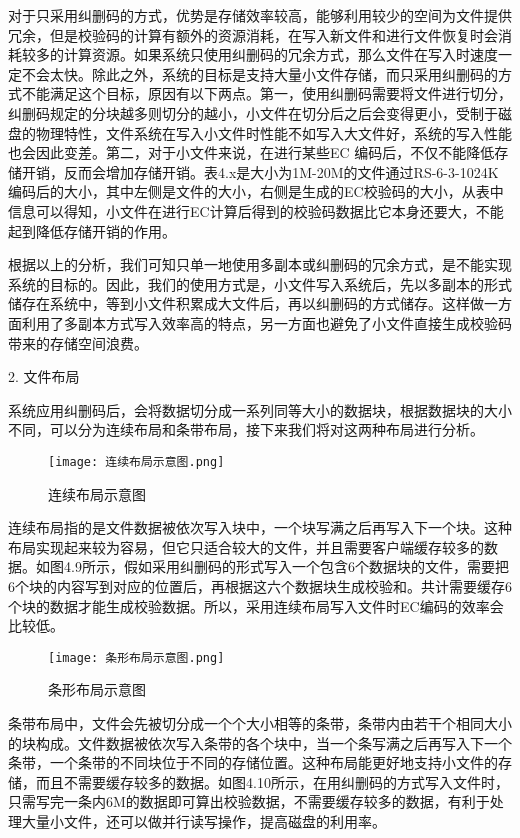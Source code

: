 对于只采用纠删码的方式，优势是存储效率较高，能够利用较少的空间为文件提供冗余，但是校验码的计算有额外的资源消耗，在写入新文件和进行文件恢复时会消耗较多的计算资源。如果系统只使用纠删码的冗余方式，那么文件在写入时速度一定不会太快。除此之外，系统的目标是支持大量小文件存储，而只采用纠删码的方式不能满足这个目标，原因有以下两点。第一，使用纠删码需要将文件进行切分，纠删码规定的分块越多则切分的越小，小文件在切分后之后会变得更小，受制于磁盘的物理特性，文件系统在写入小文件时性能不如写入大文件好，系统的写入性能也会因此变差。第二，对于小文件来说，在进行某些EC 编码后，不仅不能降低存储开销，反而会增加存储开销。表4.x是大小为1M-20M的文件通过RS-6-3-1024K编码后的大小，其中左侧是文件的大小，右侧是生成的EC校验码的大小，从表中信息可以得知，小文件在进行EC计算后得到的校验码数据比它本身还要大，不能起到降低存储开销的作用。

根据以上的分析，我们可知只单一地使用多副本或纠删码的冗余方式，是不能实现系统的目标的。因此，我们的使用方式是，小文件写入系统后，先以多副本的形式储存在系统中，等到小文件积累成大文件后，再以纠删码的方式储存。这样做一方面利用了多副本方式写入效率高的特点，另一方面也避免了小文件直接生成校验码带来的存储空间浪费。

2. 文件布局

系统应用纠删码后，会将数据切分成一系列同等大小的数据块，根据数据块的大小不同，可以分为连续布局和条带布局，接下来我们将对这两种布局进行分析。

\begin{figure}[h]
  \centering
  \texttt{[image: 连续布局示意图.png]}
  \caption{连续布局示意图}
\end{figure}

连续布局指的是文件数据被依次写入块中，一个块写满之后再写入下一个块。这种布局实现起来较为容易，但它只适合较大的文件，并且需要客户端缓存较多的数据。如图4.9所示，假如采用纠删码的形式写入一个包含6个数据块的文件，需要把6个块的内容写到对应的位置后，再根据这六个数据块生成校验和。共计需要缓存6个块的数据才能生成校验数据。所以，采用连续布局写入文件时EC编码的效率会比较低。

\begin{figure}[h]
  \centering
  \texttt{[image: 条形布局示意图.png]}
  \caption{条形布局示意图}
\end{figure}

条带布局中，文件会先被切分成一个个大小相等的条带，条带内由若干个相同大小的块构成。文件数据被依次写入条带的各个块中，当一个条写满之后再写入下一个条带，一个条带的不同块位于不同的存储位置。这种布局能更好地支持小文件的存储，而且不需要缓存较多的数据。如图4.10所示，在用纠删码的方式写入文件时，只需写完一条内6M的数据即可算出校验数据，不需要缓存较多的数据，有利于处理大量小文件，还可以做并行读写操作，提高磁盘的利用率。

